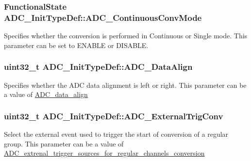 \subsubsection[{\texorpdfstring{A\+D\+C\+\_\+\+Continuous\+Conv\+Mode}{ADC_ContinuousConvMode}}]{\setlength{\rightskip}{0pt plus 5cm}Functional\+State A\+D\+C\+\_\+\+Init\+Type\+Def\+::\+A\+D\+C\+\_\+\+Continuous\+Conv\+Mode}\hypertarget{struct_a_d_c___init_type_def_a2149036a332281e70a36879a2396b8d1}{}\label{struct_a_d_c___init_type_def_a2149036a332281e70a36879a2396b8d1}
Specifies whether the conversion is performed in Continuous or Single mode. This parameter can be set to E\+N\+A\+B\+LE or D\+I\+S\+A\+B\+LE. 
\subsubsection[{\texorpdfstring{A\+D\+C\+\_\+\+Data\+Align}{ADC_DataAlign}}]{\setlength{\rightskip}{0pt plus 5cm}uint32\+\_\+t A\+D\+C\+\_\+\+Init\+Type\+Def\+::\+A\+D\+C\+\_\+\+Data\+Align}\hypertarget{struct_a_d_c___init_type_def_a622e89d8fba3900f20aaf40d5560ab7b}{}\label{struct_a_d_c___init_type_def_a622e89d8fba3900f20aaf40d5560ab7b}
Specifies whether the A\+DC data alignment is left or right. This parameter can be a value of \hyperlink{group___a_d_c__data__align}{A\+D\+C\+\_\+data\+\_\+align} 
\subsubsection[{\texorpdfstring{A\+D\+C\+\_\+\+External\+Trig\+Conv}{ADC_ExternalTrigConv}}]{\setlength{\rightskip}{0pt plus 5cm}uint32\+\_\+t A\+D\+C\+\_\+\+Init\+Type\+Def\+::\+A\+D\+C\+\_\+\+External\+Trig\+Conv}\hypertarget{struct_a_d_c___init_type_def_ae5d0c48e70c2a39355b7ab0cc1df8310}{}\label{struct_a_d_c___init_type_def_ae5d0c48e70c2a39355b7ab0cc1df8310}
Select the external event used to trigger the start of conversion of a regular group. This parameter can be a value of \hyperlink{group___a_d_c__extrenal__trigger__sources__for__regular__channels__conversion}{A\+D\+C\+\_\+extrenal\+\_\+trigger\+\_\+sources\+\_\+for\+\_\+regular\+\_\+channels\+\_\+conversion} 
